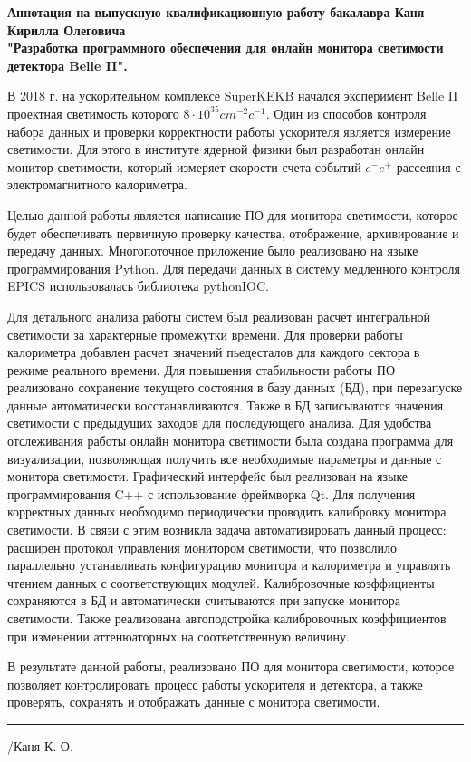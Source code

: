 \documentclass[a4paper, 14pt]{extarticle}
\begin{document}
\begin{center}
  \textbf{Аннотация на выпускную квалификационную работу бакалавра Каня Кирилла Олеговича\\ "Разработка программного обеспечения для онлайн монитора светимости детектора Belle II".}
\end{center}\par
    В 2018 г. на ускорительном комплексе SuperKEKB начался эксперимент Belle II проектная светимость которого $8\cdot10^{35} cm^{-2} c^{-1}$. Один из способов контроля набора данных и проверки корректности работы ускорителя является измерение светимости. Для этого в институте ядерной физики был разработан онлайн монитор светимости, который измеряет скорости счета событий $e^-e^+$ рассеяния с электромагнитного калориметра. \par
    Целью данной работы является написание ПО для монитора светимости, которое будет обеспечивать первичную проверку качества, отображение, архивирование и передачу данных. Многопоточное приложение было реализовано на языке программирования Python. Для передачи данных в систему медленного контроля EPICS использовалась библиотека pythonIOC. \par
Для детального анализа работы систем был реализован расчет интегральной светимости за характерные промежутки времени. Для проверки работы калориметра добавлен расчет значений пьедесталов для каждого сектора в режиме реального времени. Для повышения стабильности работы ПО реализовано сохранение текущего состояния в базу данных (БД), при перезапуске данные автоматически восстанавливаются. Также в БД записываются значения светимости с предыдущих заходов для последующего анализа. Для удобства отслеживания работы онлайн монитора светимости была создана программа для визуализации, позволяющая получить все необходимые параметры и данные с монитора светимости. Графический интерфейс был реализован на языке программирования C++ с использование фреймворка Qt. Для получения корректных данных необходимо периодически проводить калибровку монитора светимости. В связи с этим возникла задача автоматизировать данный процесс: расширен протокол управления монитором светимости, что позволило параллельно устанавливать конфигурацию монитора и калориметра и управлять чтением данных с соответствующих модулей. Калибровочные коэффициенты сохраняются в БД и автоматически считываются при запуске монитора светимости. Также реализована автоподстройка калибровочных коэффициентов при изменении аттенюаторных на соответственную величину.\par
В результате данной работы, реализовано ПО для монитора светимости, которое позволяет контролировать процесс работы ускорителя и детектора, а также проверять, сохранять и отображать данные с монитора светимости. 
\begin{flushright}
  \rule{3cm}{.5pt}/Каня К. О.
\end{flushright}
\end{document}
